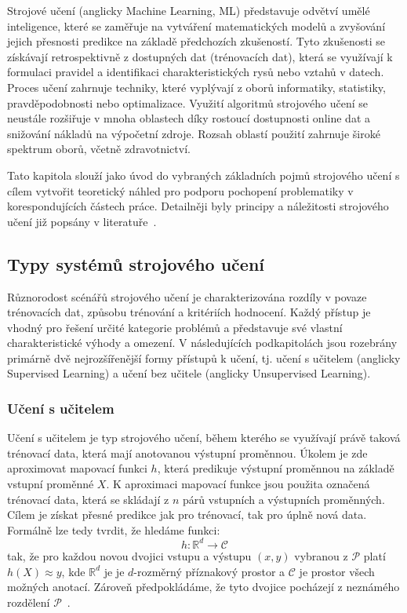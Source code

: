 Strojové učení (anglicky Machine Learning, \gls{ML}) představuje odvětví umělé
inteligence, které se zaměřuje na vytváření matematických modelů a zvyšování
jejich přesnosti predikce na základě předchozích zkušeností. Tyto zkušenosti se
získávají retrospektivně z dostupných dat (trénovacích dat), která se využívají
k formulaci pravidel a identifikaci charakteristických rysů nebo vztahů v
datech. Proces učení zahrnuje techniky, které vyplývají z  oborů informatiky,
statistiky, pravděpodobnosti nebo optimalizace. Využití algoritmů strojového
učení se neustále rozšiřuje v mnoha oblastech díky rostoucí dostupnosti online
dat a snižování nákladů na výpočetní zdroje. Rozsah oblastí použití zahrnuje
široké spektrum oborů, včetně zdravotnictví.

Tato kapitola slouží jako úvod do vybraných základních pojmů strojového učení s
cílem vytvořit teoretický náhled pro podporu pochopení problematiky v
korespondujících částech práce. Detailněji byly principy a náležitosti
strojového učení již popsány v
literatuře~\cite{Aurelien2022,Murphy2012,Goodfellow2016}.

\subsection{Typy systémů strojového učení}
Různorodost scénářů strojového učení je charakterizována rozdíly v povaze
trénovacích dat, způsobu trénování a kritériích hodnocení. Každý přístup je
vhodný pro řešení určité kategorie problémů a představuje své vlastní
charakteristické výhody a omezení. V následujících podkapitolách jsou rozebrány
primárně dvě nejrozšířenější formy přístupů k učení, tj. učení s učitelem
(anglicky Supervised Learning) a učení bez učitele (anglicky Unsupervised
Learning).

\subsubsection{Učení s učitelem}
\label{subsubsec:supervised_learning}
Učení s učitelem je typ strojového učení, během kterého se využívají právě
taková trénovací data, která mají anotovanou výstupní proměnnou. Úkolem je zde
aproximovat mapovací funkci $h$, která predikuje výstupní proměnnou na základě
vstupní proměnné $X$. K aproximaci mapovací funkce jsou použita označená
trénovací data, která se skládají z $n$ párů vstupních a výstupních proměnných.
Cílem je získat přesné predikce jak pro trénovací, tak pro úplně nová data.
Formálně lze tedy tvrdit, že hledáme funkci:
\begin{equation}
    h:\mathbb{R}^d \rightarrow \mathcal{C}
\end{equation}
tak, že pro každou novou dvojici vstupu a výstupu $(x,y)$ vybranou z
$\mathcal{P}$ platí $h(X) ≈ y$, kde $\mathbb{R}^d$ je je $d$-rozměrný příznakový
prostor a $\mathcal{C}$ je prostor všech možných anotací. Zároveň předpokládáme,
že tyto dvojice pocházejí z neznámého rozdělení
$\mathcal{P}$~\cite{Murphy2012}.

